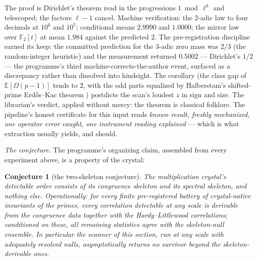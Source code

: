 \documentclass[11pt]{article}
\newtheorem{conjecture}{Conjecture}
\theoremstyle{remark}
\begin{document}
\noindent The proof is Dirichlet's theorem \cite{Dirichlet} read in the progressions
$1 \bmod \ell^k$ and telescoped; the factors $\ell - 1$ cancel. Machine verification: the $2$-adic
law to four decimals at $10^6$ and $10^7$; conditional means $2.9990$ and $1.0000$; the mirror law
over $\mathbb{F}_2[t]$ at mean $1.984$ against the predicted $2$. The pre-registration discipline
earned its keep: the committed prediction for the $3$-adic zero mass was $2/3$ (the random-integer
heuristic) and the measurement returned $0.5002$ --- Dirichlet's $1/2$ --- the programme's third
machine-corrects-the-author event, surfaced as a discrepancy rather than dissolved into hindsight.
The corollary (the class gap of $\mathbb{E}[\Omega(p-1)]$ tends to $2$, with the odd parts equalized
by Halberstam's shifted-prime Erd\H{o}s--Kac theorem \cite{Halberstam}) postdicts the scan's loudest
$z$ in sign and size. The librarian's verdict, applied without mercy: the theorem is classical
folklore. The pipeline's honest certificate for this input reads \emph{known result, freshly
mechanized, one operator error caught, one instrument reading explained} --- which is what
extraction usually yields, and should.

\emph{The conjecture.} The programme's organizing claim, assembled from every experiment above, is a
property of the crystal:

\begin{conjecture}[the two-skeleton conjecture]
The multiplication crystal's detectable order consists of its congruence skeleton and its spectral
skeleton, and nothing else. Operationally: for every finite pre-registered battery of crystal-native
invariants of the primes, every correlation detectable at any scale is derivable from the congruence
data together with the Hardy--Littlewood correlations; conditioned on these, all remaining
statistics agree with the skeleton-null ensemble. In particular the scanner of this section, run at
any scale with adequately resolved nulls, asymptotically returns no survivor beyond the
skeleton-derivable ones.
\end{conjecture}
\end{document}
